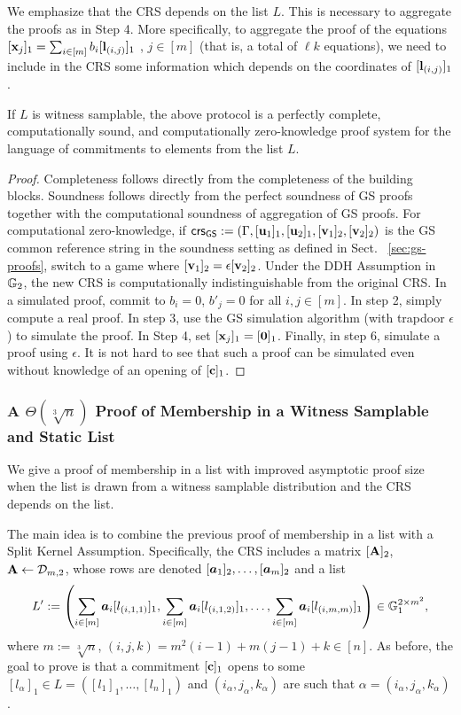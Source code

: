 We emphasize that the CRS depends on the list $L$. This is necessary to aggregate the proofs as in Step 4. More  specifically, to aggregate the proof of the equations  $[\mathbf{x}_j]_1 = \sum_{i\in[m]}b_i [\mathbf{l}_{(i,j)}]_1$ , $j\in[m]$ (that is, a total of $\ell k$ equations), we need to include in the CRS some information which depends on the coordinates of $[\mathbf{l}_{(i,j)}]_1$.

\begin{theorem}\label{theo:listsquarevect}
If $L$ is witness samplable, the above protocol is a perfectly complete, computationally sound, and computationally zero-knowledge proof system for the language of commitments to elements from the list $L$.
\end{theorem}

\begin{proof} Completeness follows directly from the completeness of the 
building blocks. Soundness follows directly from the perfect soundness of GS proofs together with the computational soundness of aggregation of GS proofs. For computational zero-knowledge, if  
$\mathsf{crs}_{\mathsf{GS}}:=(\Gamma,[\mathbf{u}_1]_1,[\mathbf{u}_2]_1,[\mathbf{v}_1]_2,[\mathbf{v}_2]_2)$ is the GS common reference string in the soundness setting as defined in Sect.~ \ref{sec:gs-proofs}, switch to a game where $[\mathbf{v}_1]_2= \epsilon [\mathbf{v}_2]_2$. Under the DDH Assumption in $\mathbb{G}_2$, the new CRS is computationally indistinguishable from the original CRS. In a simulated proof, commit to $b_i=0$, $b'_j=0$ for all $i,j \in [m]$. In step 2, simply compute a real proof. In step 3, use the GS simulation algorithm  (with trapdoor $\epsilon$) to simulate the proof. In Step 4, set $[\mathbf{x}_j]_1=[\mathbf{0}]_1$. Finally, in step 6, simulate a proof using $\epsilon$. It is not hard to see that such a proof can be simulated even without knowledge of an opening of $[\mathbf{c}]_1$. 
\end{proof}

\subsubsection{A $\Theta(\sqrt[3]{n})$ Proof of Membership in a Witness Samplable and Static List} We give a proof of membership in a list with improved asymptotic proof size when the list is drawn from a witness samplable distribution and the CRS depends on the list.

The main idea is to combine the previous proof of membership in a list with a Split Kernel Assumption. Specifically, the CRS includes a matrix $[\mathbf{{A}}]_2$, $\mathbf{{A}} \gets\mathcal{D}_{m,2}$, whose rows are denoted $[{\boldsymbol a}_1]_2,\ldots,[{\boldsymbol a}_m]_2$ and a list 
$$L':=\left(\sum_{i\in[m]}{\boldsymbol a}_i[l_{(i,1,1)}]_1,\sum_{i\in[m]}{\boldsymbol a}_i[l_{(i,1,2)}]_1,\ldots,\sum_{i\in[m]}{\boldsymbol a}_i[l_{(i,m,m)}]_1\right)\in\mathbb{G}_1^{2\times m^2},$$
where $m:=\sqrt[3]{n}$, $(i,j,k)=m^2(i-1)+m(j-1)+k\in[n]$. As before, the goal to prove is that a commitment $[\mathbf{c}]_1$ opens to some $[l_{\alpha}]_1 \in L=([l_1]_1,\ldots,[l_n]_1)$ and  $(i_{\alpha},j_{\alpha},k_{\alpha})$ are such that $\alpha=(i_{\alpha},j_{\alpha},k_{\alpha})$.

